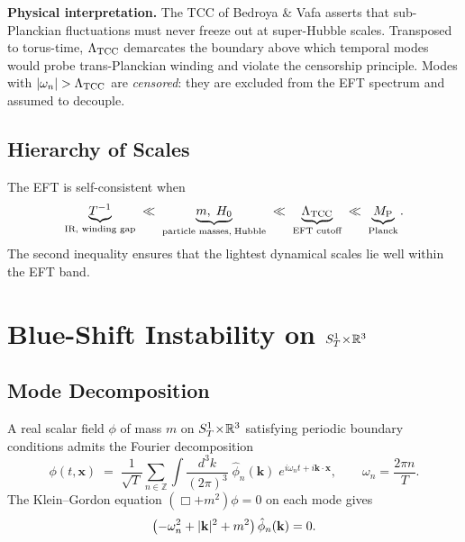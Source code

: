\documentclass[12pt,openany]{book}
\begin{document}
\noindent\textbf{Physical interpretation.}
The TCC of Bedroya \& Vafa \cite{BedroyaVafa2019} asserts that
sub-Planckian fluctuations must never freeze out at super-Hubble scales.
Transposed to torus-time, $\Lambda_{\mathrm{TCC}}$ demarcates the boundary above which
temporal modes would probe trans-Planckian winding and violate the
censorship principle.
Modes with $\lvert \omega_{n} \rvert>\Lambda_{\mathrm{TCC}}$ are \emph{censored}: they are
excluded from the EFT spectrum and assumed to decouple.

\subsection{Hierarchy of Scales}
\label{sec:hierarchy}

The EFT is self-consistent when
\begin{equation}\label{eq:hierarchy}
  \underbrace{T^{-1}}_{\text{IR, winding gap}}
  \;\ll\;
  \underbrace{m,\; H_{0}}_{\text{particle masses,\;Hubble}}
  \;\ll\;
  \underbrace{\Lambda_{\mathrm{TCC}}}_{\text{EFT cutoff}}
  \;\ll\;
  \underbrace{M_{\mathrm{P}}}_{\text{Planck}}.
\end{equation}
The second inequality ensures that the lightest dynamical scales
lie well within the EFT band.

\section{Blue-Shift Instability on \texorpdfstring{$S^{1}_{T}\!\times\!\mathbb{R}^{3}$}{S1×R3}}
\label{sec:blueshift}

\subsection{Mode Decomposition}
\label{sec:modes}

A real scalar field $\phi$ of mass $m$ on $S^{1}_{T}\!\times\!\mathbb{R}^{3}$ satisfying periodic
boundary conditions admits the Fourier decomposition
\begin{equation}\label{eq:mode-exp}
  \phi(t,\mathbf{x})
  \;=\;
  \frac{1}{\sqrt{T}}\sum_{n\in\mathbb{Z}}
  \int\!\frac{d^{3}k}{(2\pi)^{3}}\;
  \hat{\phi}_{n}(\mathbf{k})\;
  e^{i\omega_{n}t + i\mathbf{k}\cdot\mathbf{x}},
  \qquad
  \omega_{n}=\frac{2\pi n}{T}.
\end{equation}
The Klein--Gordon equation $(\Box+m^{2})\phi=0$ on each mode gives
\begin{equation}\label{eq:dispersion}
  \bigl(-\omega_{n}^{2}+\lvert \mathbf{k} \rvert^{2}+m^{2}\bigr)\,
  \hat{\phi}_{n}(\mathbf{k}) = 0.
\end{equation}
\end{document}

